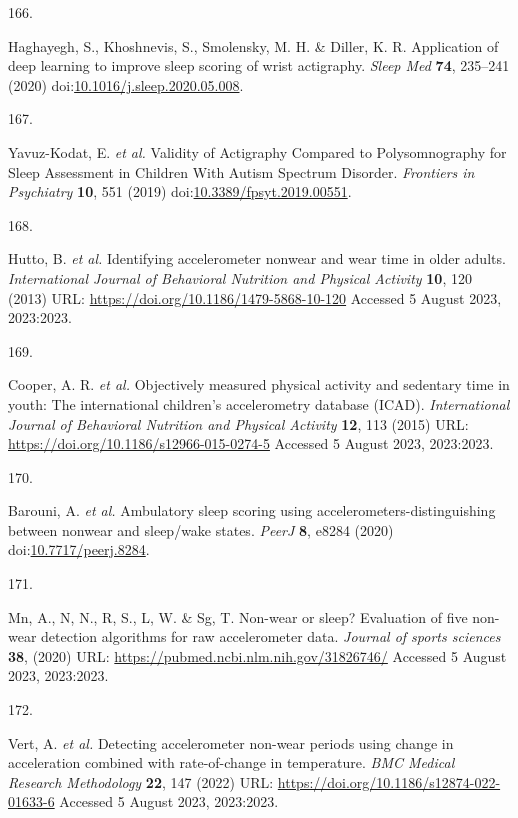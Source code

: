 \documentclass[
  10pt,
]{scrbook}
\newlength{\cslhangindent}
\newlength{\csllabelwidth}
\newlength{\cslentryspacingunit} %
\newenvironment{CSLReferences}[2] %
 {%
  \setlength{\parindent}{0pt}
  \ifodd #1
  \let\oldpar\par
  \def\par{\hangindent=\cslhangindent\oldpar}
  \fi
  \setlength{\parskip}{#2\cslentryspacingunit}
 }%
 {}
\newcommand{\CSLLeftMargin}[1]{\parbox[t]{\csllabelwidth}{#1}}
\newcommand{\CSLRightInline}[1]{\parbox[t]{\linewidth - \csllabelwidth}{#1}\break}
\let\originaltextbf\textbf
\renewcommand{\textbf}[1]{\textcolor{color1}{\textsf{\originaltextbf{#1}}}}
\begin{document}
\begin{CSLReferences}{0}{0}
\leavevmode{}%
\CSLLeftMargin{166. }%
\CSLRightInline{Haghayegh, S., Khoshnevis, S., Smolensky, M. H. \&
Diller, K. R. Application of deep learning to improve sleep scoring of
wrist actigraphy. \emph{Sleep Med} \textbf{74}, 235--241 (2020)
doi:\href{https://doi.org/10.1016/j.sleep.2020.05.008}{10.1016/j.sleep.2020.05.008}.}

\leavevmode{}%
\CSLLeftMargin{167. }%
\CSLRightInline{Yavuz-Kodat, E. \emph{et al.} Validity of Actigraphy
Compared to Polysomnography for Sleep Assessment in Children With Autism
Spectrum Disorder. \emph{Frontiers in Psychiatry} \textbf{10}, 551
(2019)
doi:\href{https://doi.org/10.3389/fpsyt.2019.00551}{10.3389/fpsyt.2019.00551}.}

\leavevmode{}%
\CSLLeftMargin{168. }%
\CSLRightInline{Hutto, B. \emph{et al.} Identifying accelerometer
nonwear and wear time in older adults. \emph{International Journal of
Behavioral Nutrition and Physical Activity} \textbf{10}, 120 (2013) URL:
\url{https://doi.org/10.1186/1479-5868-10-120} Accessed 5 August 2023,
2023:2023.}

\leavevmode{}%
\CSLLeftMargin{169. }%
\CSLRightInline{Cooper, A. R. \emph{et al.} Objectively measured
physical activity and sedentary time in youth: The international
children's accelerometry database ({ICAD}). \emph{International Journal
of Behavioral Nutrition and Physical Activity} \textbf{12}, 113 (2015)
URL: \url{https://doi.org/10.1186/s12966-015-0274-5} Accessed 5 August
2023, 2023:2023.}

\leavevmode{}%
\CSLLeftMargin{170. }%
\CSLRightInline{Barouni, A. \emph{et al.} Ambulatory sleep scoring using
accelerometers-distinguishing between nonwear and sleep/wake states.
\emph{{PeerJ}} \textbf{8}, e8284 (2020)
doi:\href{https://doi.org/10.7717/peerj.8284}{10.7717/peerj.8284}.}

\leavevmode{}%
\CSLLeftMargin{171. }%
\CSLRightInline{Mn, A., N, N., R, S., L, W. \& Sg, T. Non-wear or sleep?
Evaluation of five non-wear detection algorithms for raw accelerometer
data. \emph{Journal of sports sciences} \textbf{38}, (2020) URL:
\url{https://pubmed.ncbi.nlm.nih.gov/31826746/} Accessed 5 August 2023,
2023:2023.}

\leavevmode{}%
\CSLLeftMargin{172. }%
\CSLRightInline{Vert, A. \emph{et al.} Detecting accelerometer non-wear
periods using change in acceleration combined with rate-of-change in
temperature. \emph{{BMC} Medical Research Methodology} \textbf{22}, 147
(2022) URL: \url{https://doi.org/10.1186/s12874-022-01633-6} Accessed 5
August 2023, 2023:2023.}


\end{CSLReferences}
\end{document}
